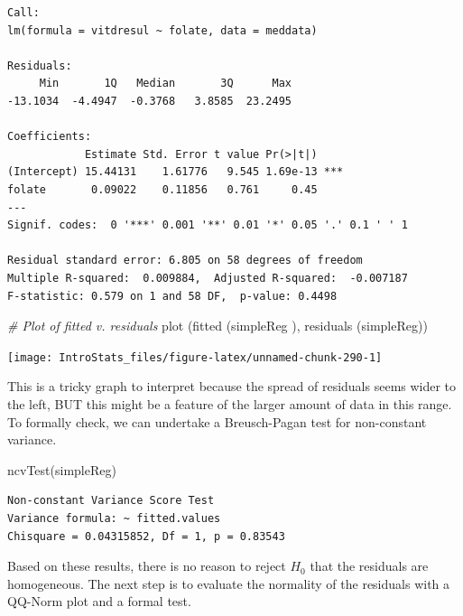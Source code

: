 \documentclass[
  oneside]{krantz}
\newenvironment{Shaded}{\begin{snugshade}}{\end{snugshade}}
\newcommand{\CommentTok}[1]{\textcolor[rgb]{0.56,0.35,0.01}{\textit{#1}}}
\newcommand{\FunctionTok}[1]{\textcolor[rgb]{0.00,0.00,0.00}{#1}}
\newcommand{\NormalTok}[1]{#1}
\begin{document}
\begin{verbatim}
Call:
lm(formula = vitdresul ~ folate, data = meddata)

Residuals:
     Min       1Q   Median       3Q      Max 
-13.1034  -4.4947  -0.3768   3.8585  23.2495 

Coefficients:
            Estimate Std. Error t value Pr(>|t|)    
(Intercept) 15.44131    1.61776   9.545 1.69e-13 ***
folate       0.09022    0.11856   0.761     0.45    
---
Signif. codes:  0 '***' 0.001 '**' 0.01 '*' 0.05 '.' 0.1 ' ' 1

Residual standard error: 6.805 on 58 degrees of freedom
Multiple R-squared:  0.009884,  Adjusted R-squared:  -0.007187 
F-statistic: 0.579 on 1 and 58 DF,  p-value: 0.4498
\end{verbatim}

\begin{Shaded}
\begin{Highlighting}[]
\CommentTok{\# Plot of fitted v. residuals }
\FunctionTok{plot}\NormalTok{ (}\FunctionTok{fitted}\NormalTok{ (simpleReg ), }\FunctionTok{residuals}\NormalTok{ (simpleReg))}
\end{Highlighting}
\end{Shaded}

\begin{center}\texttt{[image: IntroStats\_files/figure-latex/unnamed-chunk-290-1]} \end{center}

This is a tricky graph to interpret because the spread of residuals seems wider to the left, BUT this might be a feature of the larger amount of data in this range. To formally check, we can undertake a Breusch-Pagan test for non-constant variance.

\begin{Shaded}
\begin{Highlighting}[]
\FunctionTok{ncvTest}\NormalTok{(simpleReg)}
\end{Highlighting}
\end{Shaded}

\begin{verbatim}
Non-constant Variance Score Test 
Variance formula: ~ fitted.values 
Chisquare = 0.04315852, Df = 1, p = 0.83543
\end{verbatim}

Based on these results, there is no reason to reject \(H_0\) that the residuals are homogeneous. The next step is to evaluate the normality of the residuals with a QQ-Norm plot and a formal test.
\end{document}

